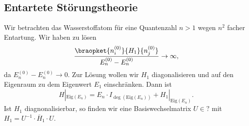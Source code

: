 \documentclass{subfiles}
\begin{document}
    \subsection{Entartete Störungstheorie}
        Wir betrachten das Wasserstoffatom für eine Quantenzahl $n > 1$ wegen $n^2$ facher Entartung. Wir haben zu lösen
        \[
            \frac{\braopket{n_i^{(0)}}{H_1}{n_j^{(0)}}}{E_n^{(0)} - E_{n}^{(0)}}\to\infty,
        \]
        da $E_n^{(0)} - E_{n}^{(0)} \to 0$. Zur Lösung wollen wir $H_1$ diagonalisieren und auf den Eigenraum zu dem Eigenwert $E_1$ einschränken. Dann ist 
        \[
            H|_{\text{Eig}(E_n)} = E_n\cdot I_{\deg(\text{Eig}(E_n))} + H_1|_{\text{Eig}(E_n)}.
        \]
        Ist $H_1$ diagnonalisierbar, so finden wir eine Basiswechselmatrix $U\in ?$ mit $H_1 = U^{-1}\cdot\overline H_1\cdot U$. 
        
\end{document}
